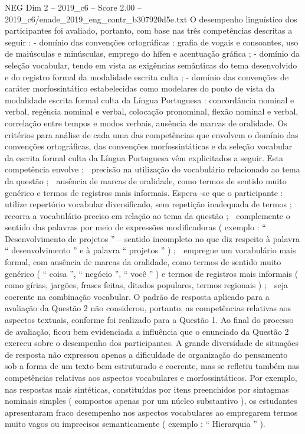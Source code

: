 \begin{textsample}{NEG Dim 2 – 2019\_c6 – Score 2.00 – 2019\_c6/enade\_2019\_eng\_contr\_b307920d5e.txt}
O desempenho linguístico dos participantes foi avaliado, portanto, com base nas três competências descritas a seguir : - domínio das convenções ortográficas : grafia de vogais e consoantes, uso de maiúsculas e minúsculas, emprego do hífen e acentuação gráfica ; - domínio da seleção vocabular, tendo em vista as exigências semânticas do tema desenvolvido e do registro formal da modalidade escrita culta ; - domínio das convenções de caráter morfossintático estabelecidas como modelares do ponto de vista da modalidade escrita formal culta da Língua Portuguesa : concordância nominal e verbal, regência nominal e verbal, colocação pronominal, flexão nominal e verbal, correlação entre tempos e modos verbais, ausência de marcas de oralidade.
Os critérios para análise de cada uma das competências que envolvem o domínio das convenções ortográficas, das convenções morfossintáticas e da seleção vocabular da escrita formal culta da Língua Portuguesa vêm explicitados a seguir.
Esta competência envolve :  precisão na utilização do vocabulário relacionado ao tema da questão ;  ausência de marcas de oralidade, como termos de sentido muito genérico e termos de registros mais informais.
Espera -se que o participante :  utilize repertório vocabular diversificado, sem repetição inadequada de termos ;  recorra a vocabulário preciso em relação ao tema da questão ;  complemente o sentido das palavras por meio de expressões modificadoras ( exemplo : “ Desenvolvimento de projetos ” – sentido incompleto no que diz respeito à palavra “ desenvolvimento ” e à palavra “ projetos ” ) ;  empregue um vocabulário mais formal, com ausência de marcas da oralidade, como termos de sentido muito genérico ( “ coisa ”, “ negócio ”, “ você ” ) e termos de registros mais informais ( como gírias, jargões, frases feitas, ditados populares, termos regionais ) ;  seja coerente na combinação vocabular.
O padrão de resposta aplicado para a avaliação da Questão 2 não considerou, portanto, as competências relativas aos aspectos textuais, conforme foi realizado para a Questão 1.
Ao final do processo de avaliação, ficou bem evidenciada a influência que o enunciado da Questão 2 exerceu sobre o desempenho dos participantes.
A grande diversidade de situações de resposta não expressou apenas a dificuldade de organização do pensamento sob a forma de um texto bem estruturado e coerente, mas se refletiu também nas competências relativas aos aspectos vocabulares e morfossintáticos.
Por exemplo, nas respostas mais sintéticas, constituídas por itens preenchidos por sintagmas nominais simples ( compostos apenas por um núcleo substantivo ), os estudantes apresentaram fraco desempenho nos aspectos vocabulares ao empregarem termos muito vagos ou imprecisos semanticamente ( exemplo : “ Hierarquia ” ).

\end{textsample}
